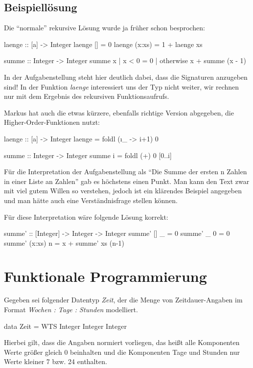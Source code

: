 \documentclass[11pt,a4paper,oneside,ngerman]{scrbook}
\begin{document}
\subsection{Beispiellösung}
Die "`normale"' rekursive Lösung wurde ja früher schon besprochen:
\begin{code}
  laenge :: [a] -> Integer
  laenge [] = 0
  laenge (x:xs) = 1 + laenge xs

  summe :: Integer -> Integer
  summe x | x < 0 = 0 
          | otherwise x + summe (x - 1)
\end{code}
In der Aufgabenstellung steht hier deutlich dabei, dass die Signaturen anzugeben sind! In der Funktion \emph{laenge} interessiert uns der Typ nicht weiter, wir rechnen nur mit dem Ergebnis des rekursiven Funktionsaufrufs.

Markus hat auch die etwas kürzere, ebenfalls richtige Version abgegeben, die Higher-Order-Funktionen nutzt:

\begin{code}
  laenge :: [a] -> Integer
  laenge = foldl (\i _ -> i+1) 0

  summe :: Integer -> Integer
  summe i = foldl (+) 0 [0..i] 
\end{code}

Für die Interpretation der Aufgabenstellung als "`Die Summe der ersten n Zahlen in einer Liste an Zahlen"' gab es höchstens einen Punkt. Man kann den Text zwar mit viel gutem Willen so verstehen, jedoch ist ein klärendes Beispiel angegeben und man hätte auch eine Verständnisfrage stellen können.

Für diese Interpretation wäre folgende Lösung korrekt:

\begin{code}
  summe' :: [Integer] -> Integer -> Integer
  summe' [] _ = 0
  summe' _ 0 = 0
  summe' (x:xs) n = x + summe' xs (n-1)
\end{code}


\newpage


\section{Funktionale Programmierung}
Gegeben sei folgender Datentyp \emph{Zeit}, der die Menge von Zeitdauer-Angaben im Format \emph{Wochen : Tage : Stunden} modelliert.
\begin{code}
  data Zeit = WTS Integer Integer Integer
\end{code}
Hierbei gilt, dass die Angaben normiert vorliegen, das heißt alle Komponenten Werte größer gleich 0 beinhalten und die Komponenten Tage und Stunden nur Werte kleiner 7 bzw. 24 enthalten.
\end{document}

